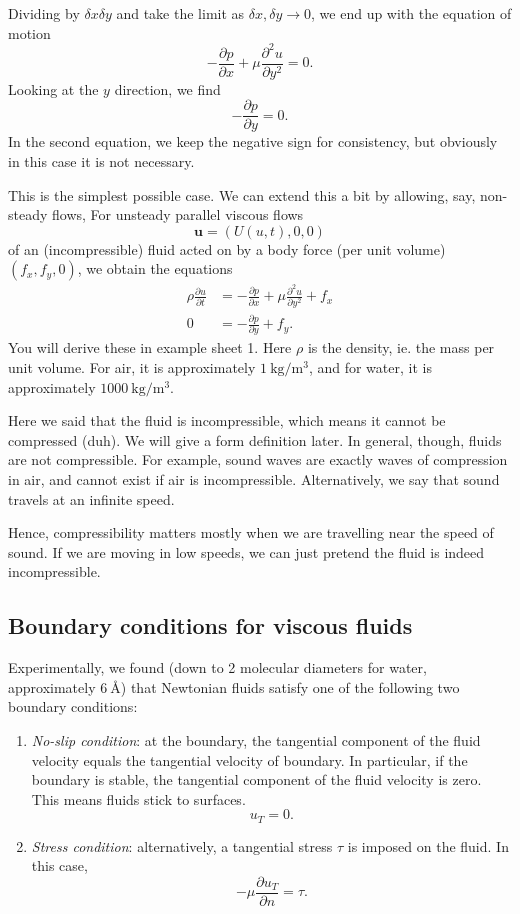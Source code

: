 \documentclass[a4paper]{article}
\begin{document}
Dividing by $\delta x \delta y$ and take the limit as $\delta x, \delta y \to 0$, we end up with the equation of motion
\[
  -\frac{\partial p}{\partial x} + \mu \frac{\partial^2 u}{\partial y^2} = 0.\tag{1.2a}
\]
Looking at the $y$ direction, we find
\[
  -\frac{\partial p}{\partial y} = 0.\tag{1.2b}
\]
In the second equation, we keep the negative sign for consistency, but obviously in this case it is not necessary.

This is the simplest possible case. We can extend this a bit by allowing, say, non-steady flows, For unsteady parallel viscous flows
\[
  \mathbf{u} = (U(u, t), 0, 0)
\]
of an (incompressible) fluid acted on by a body force (per unit volume) $(f_x, f_y, 0)$, we obtain the equations
\begin{align*}
  \rho\frac{\partial u}{\partial t} &= -\frac{\partial p}{\partial x} + \mu \frac{\partial^2 u}{\partial y^2} + f_x\tag{1.3a}\\
  0 &=-\frac{\partial p}{\partial y} + f_y.\tag{1.3b}
\end{align*}
You will derive these in example sheet 1. Here $\rho$ is the density, ie. the mass per unit volume. For air, it is approximately $\SI{1}{\kilo\gram\per\meter\cubed}$, and for water, it is approximately $\SI{1000}{\kilo\gram\per\meter\cubed}$.

Here we said that the fluid is incompressible, which means it cannot be compressed (duh). We will give a form definition later. In general, though, fluids are not compressible. For example, sound waves are exactly waves of compression in air, and cannot exist if air is incompressible. Alternatively, we say that sound travels at an infinite speed.

Hence, compressibility matters mostly when we are travelling near the speed of sound. If we are moving in low speeds, we can just pretend the fluid is indeed incompressible.

\subsection{Boundary conditions for viscous fluids}
Experimentally, we found (down to 2 molecular diameters for water, approximately $\SI{6}{\angstrom}$) that Newtonian fluids satisfy one of the following two boundary conditions:
\begin{enumerate}
  \item \emph{No-slip condition}: at the boundary, the tangential component of the fluid velocity equals the tangential velocity of boundary. In particular, if the boundary is stable, the tangential component of the fluid velocity is zero. This means fluids stick to surfaces.
    \[
      u_T = 0.\tag{1.5}
    \]
  \item \emph{Stress condition}: alternatively, a tangential stress $\tau$ is imposed on the fluid. In this case,
    \[
      -\mu \frac{\partial u_T}{\partial n} = \tau.\tag{1.5}
    \]
\end{enumerate}
\end{document}
